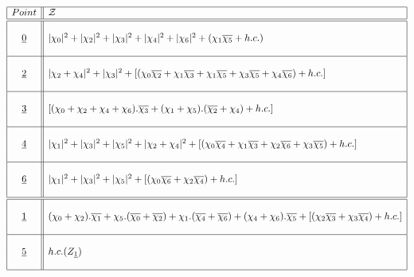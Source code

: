 \documentclass[a4paper,11pt]{article}
\newcommand{\ch}[1]{\chi_{#1}}
\newcommand{\och}[1]{\overline{\chi_{#1}}}
\newcommand{\ud}[1]{\underline{#1}}
\newcommand{\xa}[1]{|\chi_{#1}|^2}
\newcommand{\xaa}[2]{|\chi_{#1} + \chi_{#2}|^2}
\newcommand{\xx}[2]{\chi_{#1}\overline{\chi_{#2}}}
\begin{document}

\begin{table}
\scriptsize
$$
\begin{array}{|c||l|}
\hline
Point & \mathcal{Z} \\
\hline
\hline
{}  &  {}  \\
\ud0  & \xa{0} + \xa{2} + \xa{3} + \xa{4} + \xa{6} + (\xx{1}{5} + h.c.) \\
{}  &  {}  \\
\hline
{}  &  {}  \\
\ud2  & \xaa{2}{4} + \xa{3} + [( \xx{0}{2} + \xx{1}{3} + \xx{1}{5} +
\xx{3}{5} + \xx{4}{6}) + h.c.] \\
{}  &  {}  \\
\hline
{}  &  {}  \\
\ud3  & [(\ch{0} + \ch{2} + \ch{4} + \ch{6}).\och{3} + (\ch{1} + \ch{5}).
(\och{2} + \ch{4})  + h.c.]  \\
{}  &  {}  \\
\hline
{}  &  {}  \\
\ud4  & \xa{1} + \xa{3} + \xa{5} + \xaa{2}{4} + [ (\xx{0}{4} + \xx{1}{3}
       + \xx{2}{6} + \xx{3}{5} ) + h.c. ] \\
{}  &  {}  \\
\hline
{}  &  {}  \\
\ud6  &  \xa{1} + \xa{3} + \xa{5} + [(\xx{0}{6} + \xx{2}{4}) + h.c.] \\
{}  &  {}  \\
\hline
\hline
{}  &  {}  \\
\ud1  & (\ch{0} + \ch{2}).\och{1} + \ch{5}.(\och{0} + \och{2}) +
\ch{1} .(\och{4} + \och{6})+ (\ch{4} + \ch{6}).\och{5} + [(\xx{2}{3}
+ \xx{3}{4}) + h.c.]\\
{}  &  {}  \\
\hline
{}  &  {}  \\
\ud5  &  h.c.(Z_{\ud1}) \\
{}  &  {}  \\
\hline
\end{array}
$$
\normalsize
\caption{Twisted partition functions for the $D_5$ model}
\end{table}



\end{document}
